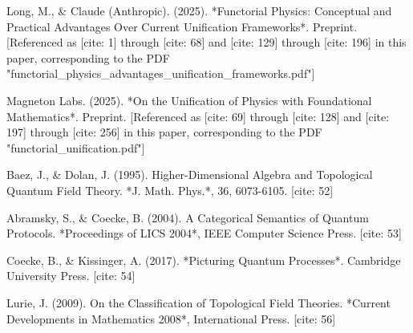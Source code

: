 \documentclass[11pt,a4paper]{article}
\begin{document}
\begin{thebibliography}{1}

Long, M., \& Claude (Anthropic). (2025). *Functorial Physics: Conceptual and Practical Advantages Over Current Unification Frameworks*. Preprint. [Referenced as [cite: 1] through [cite: 68] and [cite: 129] through [cite: 196] in this paper, corresponding to the PDF "functorial\_physics\_advantages\_unification\_frameworks.pdf"]

Magneton Labs. (2025). *On the Unification of Physics with Foundational Mathematics*. Preprint. [Referenced as [cite: 69] through [cite: 128] and [cite: 197] through [cite: 256] in this paper, corresponding to the PDF "functorial\_unification.pdf"]


Baez, J., \& Dolan, J. (1995). Higher-Dimensional Algebra and Topological Quantum Field Theory. *J. Math. Phys.*, 36, 6073-6105. [cite: 52]

Abramsky, S., \& Coecke, B. (2004). A Categorical Semantics of Quantum Protocols. *Proceedings of LICS 2004*, IEEE Computer Science Press. [cite: 53]

Coecke, B., \& Kissinger, A. (2017). *Picturing Quantum Processes*. Cambridge University Press. [cite: 54]

Lurie, J. (2009). On the Classification of Topological Field Theories. *Current Developments in Mathematics 2008*, International Press. [cite: 56]

\end{thebibliography}
\end{document}
